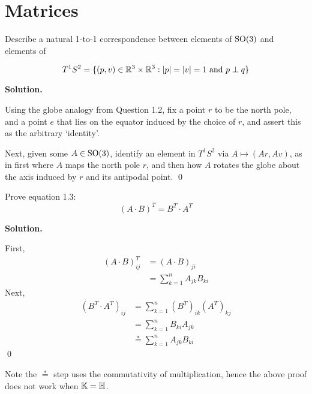 \documentclass[12pt]{book}
\theoremstyle{definition}
\newenvironment{solution}
{%
  \par\noindent\textbf{Solution.}\quad
}
{%
  \qed\par
}
\begin{document}
\mainmatter

\chapter{Matrices}

\begin{taggedexercise}[Complete]
Describe a natural 1-to-1 correspondence between elements of $\mathrm{SO}(3)$ and elements of

\[
T^1S^2 = \{ (p, v) \in \mathbb{R}^3 \times \mathbb{R}^3 : |p| = |v| = 1 \text{ and } p \perp q\}
\]

\end{taggedexercise}

\begin{solution}
Using the globe analogy from Question 1.2, fix a point $r$ to be the north pole, 
and a point $e$ that lies on the equator induced by the choice of $r$, and assert this as the arbitrary `identity'.

Next, given some $A \in \mathrm{SO}(3)$, identify an element in $T^1S^2$ via $A \mapsto (Ar, Av)$, 
as in first where $A$ maps the north pole $r$, and then how $A$ rotates the globe about the axis induced by $r$ and its antipodal point.
\end{solution}

\begin{taggedexercise}[Complete]
  Prove equation 1.3:
  \[
  (A \cdot B)^T = B^T \cdot A^T
  \]
\end{taggedexercise}

\begin{solution}
  First, 
  \[
    \begin{aligned}
      (A \cdot B)^T_{ij} &= (A \cdot B)_{ji} \\
                         &= \sum_{k=1}^n A_{jk}B_{ki}
   \end{aligned}
  \]
   Next, 
   \[
    \begin{aligned}
      (B^T \cdot A^T)_{ij} &= \sum_{k=1}^n(B^T)_{ik}(A^T)_{kj} \\
                         &= \sum_{k=1}^n B_{ki}A_{jk} \\
                         &\stackrel{*}{=} \sum_{k=1}^n A_{jk}B_{ki}
   \end{aligned}
  \]
\end{solution}

Note the $\stackrel{*}{=}$ step uses the commutativity of multiplication, 
hence the above proof does not work when $\mathbb{K} = \mathbb{H}$.
\end{document}
